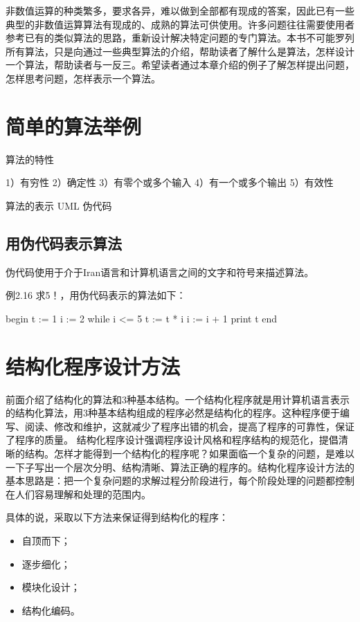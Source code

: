 \begin{lslisting}
\begin{enumerate}
非数值运算的种类繁多，要求各异，难以做到全部都有现成的答案，因此已有一些典型的非数值运算算法有现成的、成熟的算法可供使用。许多问题往往需要使用者参考已有的类似算法的思路，重新设计解决特定问题的专门算法。本书不可能罗列所有算法，只是向通过一些典型算法的介绍，帮助读者了解什么是算法，怎样设计一个算法，帮助读者与一反三。希望读者通过本章介绍的例子了解怎样提出问题，怎样思考问题，怎样表示一个算法。

\section{简单的算法举例}

算法的特性

1）有穷性
2）确定性
3）有零个或多个输入
4）有一个或多个输出
5）有效性

算法的表示
UML
伪代码

\subsection{用伪代码表示算法}

伪代码使用于介于Iran语言和计算机语言之间的文字和符号来描述算法。

例2.16 求5！，用伪代码表示的算法如下：
\begin{lslisting}
begin
t := 1
i := 2
while i <= 5
{
	t := t * i
	i := i + 1
}
print t
end
\end{lslisting}

\section{结构化程序设计方法}

前面介绍了结构化的算法和3种基本结构。一个结构化程序就是用计算机语言表示的结构化算法，用3种基本结构组成的程序必然是结构化的程序。这种程序便于编写、阅读、修改和维护，这就减少了程序出错的机会，提高了程序的可靠性，保证了程序的质量。
结构化程序设计强调程序设计风格和程序结构的规范化，提倡清晰的结构。怎样才能得到一个结构化的程序呢？如果面临一个复杂的问题，是难以一下子写出一个层次分明、结构清晰、算法正确的程序的。结构化程序设计方法的基本思路是：把一个复杂问题的求解过程分阶段进行，每个阶段处理的问题都控制在人们容易理解和处理的范围内。

具体的说，采取以下方法来保证得到结构化的程序：
\begin{itemize}
	\item 自顶而下；
	\item 逐步细化；
	\item 模块化设计；
	\item 结构化编码。
\end{itemize}


\end{enumerate}
\end{lslisting}
